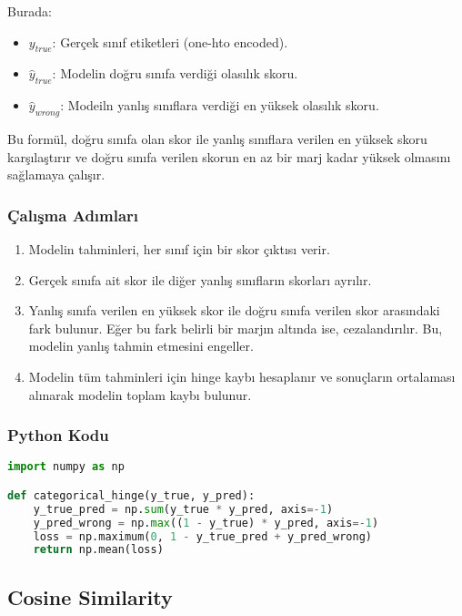 Burada:

\begin{itemize}
    \item $y_{true}$: Gerçek sınıf etiketleri (one-hto encoded).
    \item $\hat{y}_{true}$: Modelin doğru sınıfa verdiği olasılık skoru.
    \item $\hat{y}_{wrong}$: Modeiln yanlış sınıflara verdiği en yüksek olasılık skoru.
\end{itemize}

Bu formül, doğru sınıfa olan skor ile yanlış sınıflara verilen en yüksek skoru karşılaştırır ve doğru sınıfa verilen skorun en az bir marj kadar yüksek olmasını sağlamaya çalışır.

\subsubsection{Çalışma Adımları}

\begin{enumerate}
    \item Modelin tahminleri, her sınıf için bir skor çıktısı verir.
    \item Gerçek sınıfa ait skor ile diğer yanlış sınıfların skorları ayrılır.
    \item Yanlış sınıfa verilen en yüksek skor ile doğru sınıfa verilen skor arasındaki fark bulunur. Eğer bu fark belirli bir marjın altında ise, cezalandırılır. Bu, modelin yanlış tahmin etmesini engeller.
    \item Modelin tüm tahminleri için hinge kaybı hesaplanır ve sonuçların ortalaması alınarak modelin toplam kaybı bulunur.
\end{enumerate}

\subsubsection{Python Kodu}

\begin{lstlisting}[language=Python]
import numpy as np

def categorical_hinge(y_true, y_pred):
    y_true_pred = np.sum(y_true * y_pred, axis=-1)
    y_pred_wrong = np.max((1 - y_true) * y_pred, axis=-1)
    loss = np.maximum(0, 1 - y_true_pred + y_pred_wrong)
    return np.mean(loss)
\end{lstlisting}

\newpage

\subsection{Cosine Similarity}

